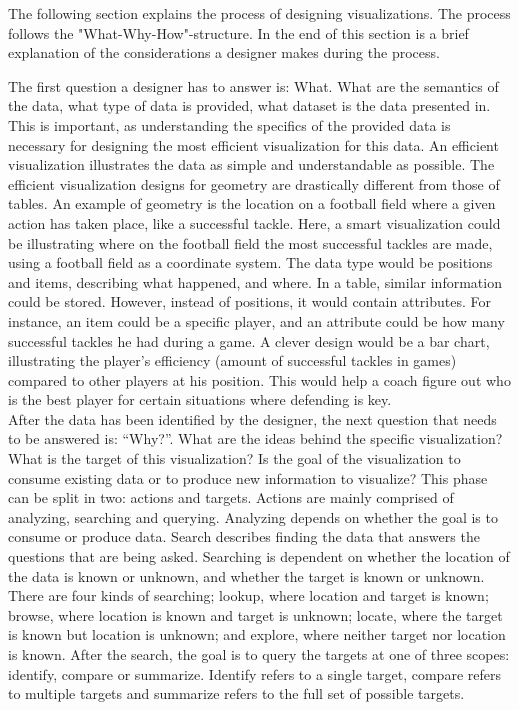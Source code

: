 \documentclass[Report.tex]{subfiles}
\begin{document}
The following section explains the process of designing visualizations. The process follows the "What-Why-How"-structure. In the end of this section is a brief explanation of the considerations a designer makes during the process.

The first question a designer has to answer is: What. What are the semantics of the data, what type of data is provided, what dataset is the data presented in. This is important, as understanding the specifics of the provided data is necessary for designing the most efficient visualization for this data. An efficient visualization illustrates the data as simple and understandable as possible. The efficient visualization designs for geometry are drastically different from those of tables. An example of geometry is the location on a football field where a given action has taken place, like a successful tackle. Here, a smart visualization could be illustrating where on the football field the most successful tackles are made, using a football field as a coordinate system. The data type would be positions and items, describing what happened, and where. In a table, similar information could be stored. However, instead of positions, it would contain attributes. For instance, an item could be a specific player, and an attribute could be how many successful tackles he had during a game. A clever design would be a bar chart, illustrating the player’s efficiency (amount of successful tackles in games) compared to other players at his position. This would help a coach figure out who is the best player for certain situations where defending is key.\\
After the data has been identified by the designer, the next question that needs to be answered is: “Why?”. What are the ideas behind the specific visualization? What is the target of this visualization? Is the goal of the visualization to consume existing data or to produce new information to visualize? This phase can be split in two: actions and targets. Actions are mainly comprised of analyzing, searching and querying. Analyzing depends on whether the goal is to consume or produce data. Search describes finding the data that answers the questions that are being asked. Searching is dependent on whether the location of the data is known or unknown, and whether the target is known or unknown. There are four kinds of searching; lookup, where location and target is known; browse, where location is known and target is unknown; locate, where the target is known but location is unknown; and explore, where neither target nor location is known. After the search, the goal is to query the targets at one of three scopes: identify, compare or summarize. Identify refers to a single target, compare refers to multiple targets and summarize refers to the full set of possible targets.
\end{document}
